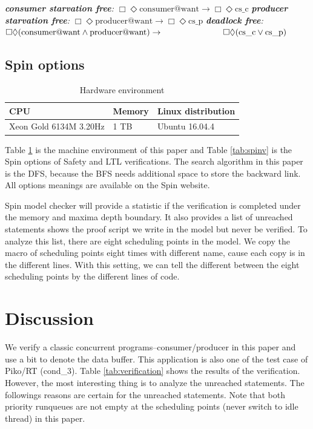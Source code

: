 {\smallbreak\indent\textit{\textbf{consumer starvation free}: $\Box\Diamond\text{consumer@want} \rightarrow\Box\Diamond\text{cs\_c}$}}
{\indent\textit{\textbf{producer starvation free}: $\Box\Diamond\text{producer@want} \rightarrow\Box\Diamond\text{cs\_p}$}}
{\indent\textit{\textbf{deadlock free}: $\Box\Diamond(\text{consumer@want}\wedge\text{producer@want})\rightarrow\hspace*{2.5cm}\Box\Diamond(\text{cs\_c}\vee\text{cs\_p})$}}

\subsection{Spin options} 

\begin{table}
\caption{Hardware environment}
\label{tab:env}
\begin{tabular}{lll}
\toprule
CPU & Memory & Linux distribution \\
\hline
Xeon Gold 6134M 3.20Hz & 1 TB & Ubuntu 16.04.4 \\
\bottomrule
\end{tabular}
\end{table}


Table \ref{tab:env} is the machine environment of this paper and Table \ref{tab:spinv} is the Spin options of Safety and LTL verifications. The search algorithm in this paper is the DFS, because the BFS needs additional space to store the backward link. All options meanings are available on the Spin website.

Spin model checker will provide a statistic if the verification is completed under the memory and maxima depth boundary. It also provides a list of unreached statements shows the proof script we write in the model but never be verified. To analyze this list, there are eight scheduling points in the model. We copy the macro of scheduling points eight times with different name, cause each copy is in the different lines. With this setting, we can tell the different between the eight scheduling points by the different lines of code.

\section{Discussion}
We verify a classic concurrent programs--consumer/producer in this paper and use a bit to denote the data buffer. This application is also one of the test case of Piko/RT (cond\_3). Table \ref{tab:verification} shows the results of the verification. However, the most interesting thing is to analyze the unreached statements. The followings reasons are certain for the unreached statements. Note that both priority runqueues are not empty at the scheduling points (never switch to idle thread) in this paper.

